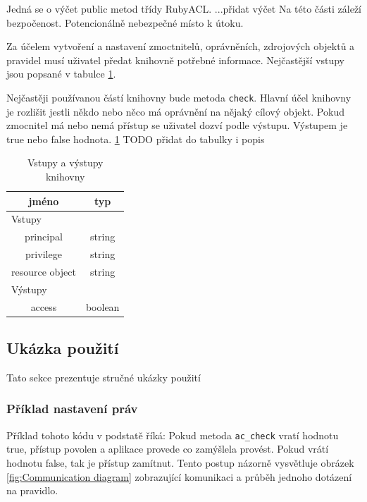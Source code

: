 Jedná se o výčet public metod třídy RubyACL.
...přidat výčet
Na této části záleží bezpočenost. Potencionálně nebezpečné místo k útoku.

 Za účelem vytvoření a nastavení zmoctnitelů, oprávněních, zdrojových objektů a pravidel musí uživatel předat knihovně potřebné informace. Nejčastější vstupy jsou popsané v tabulce \ref{tab:tab3}.

Nejčastěji používanou částí knihovny bude metoda \verb|check|. Hlavní účel knihovny je rozlišit jestli někdo nebo něco má oprávnění na nějaký cílový objekt. Pokud zmocnitel má nebo nemá přístup se uživatel dozví podle výstupu. Výstupem je true nebo false hodnota. \ref{tab:tab3} TODO přidat do tabulky i popis



\begin{table}[h]
\centering
\begin{tabular}{|c|c|}
\hline
\textbf{jméno} & \textbf{typ} \\
\hline
\multicolumn{2}{|l|}{Vstupy} \\
\hline
principal & string\\
\hline
privilege & string\\
\hline
resource object & string\\
\hline
\hline
\multicolumn{2}{|l|}{Výstupy} \\
\hline
access & boolean\\
\hline
\end{tabular}
\caption{Vstupy a výstupy knihovny}
\label{tab:tab3}
\end{table}

\subsection{Ukázka použití}
Tato sekce prezentuje stručné ukázky použití

\subsubsection{Příklad nastavení práv}

Příklad tohoto kódu v podstatě říká: Pokud metoda \verb|ac_check| vratí hodnotu true, přístup povolen a aplikace provede co zamýšlela provést. Pokud vrátí hodnotu false, tak je přístup zamítnut. Tento postup názorně vysvětluje obrázek \ref{fig:Communication diagram} zobrazující komunikaci a průběh jednoho dotázení na pravidlo.

